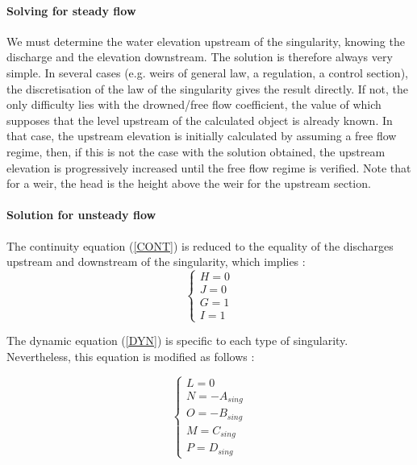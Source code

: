 \paragraph{Solving for steady flow\\}

\hspace*{1cm}

We must determine the water elevation upstream of the singularity, knowing the discharge and the elevation downstream. The solution is therefore always very simple. In several cases (e.g. weirs of general law, a regulation, a control section), the discretisation of the law of the singularity gives the result directly. If not, the only difficulty lies with the drowned/free flow coefficient, the value of which supposes that the level upstream of the calculated object is already known.
In that case, the upstream elevation is initially calculated by assuming a free flow regime, then, if this is not the case with the solution obtained, the upstream elevation is progressively increased until the free flow regime is verified. Note that for a weir, the head is the height above the weir for the upstream section.  

\paragraph{Solution for unsteady flow\\}

\hspace*{1cm}

The continuity equation (\ref{CONT}) is reduced to the equality of the discharges upstream and downstream of the singularity, which implies :
\begin{equation}
  \left \lbrace
     \begin{array}{l}
      H = 0\\
      J = 0\\
      G = 1\\
      I = 1
     \end{array}
    \right.
\end{equation}

\vspace{0.5cm}

The dynamic equation (\ref{DYN}) is specific to each type of singularity.  Nevertheless, this equation is modified as follows :

\begin{equation}
  \left \lbrace
     \begin{array}{l}
      L = 0\\
      N = -A_{sing}\\
      O = -B_{sing}\\
      M = C_{sing}\\
      P = D_{sing}
     \end{array}
    \right.
\end{equation}


